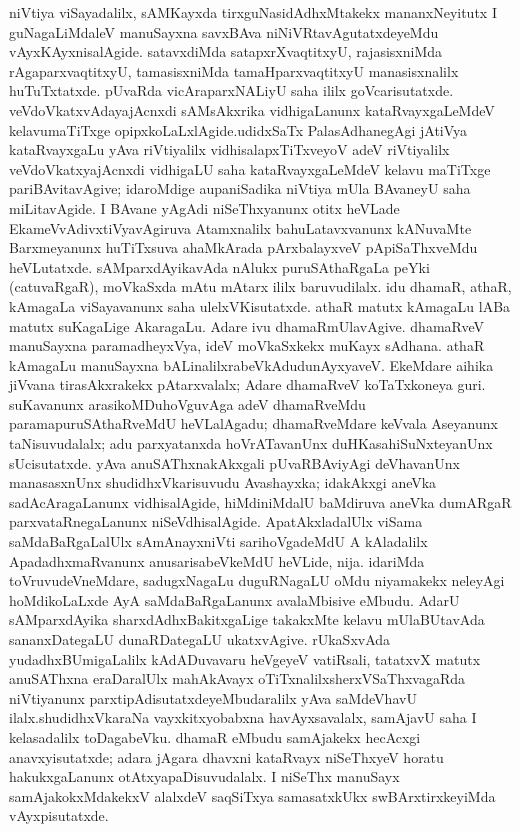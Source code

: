 niVtiya viSayadalilx, sAMKayxda tirxguNasidAdhxMtakekx mananxNeyitutx I guNa\-gaLiMdaleV manuSayxna savxBAva niNiVRtavAgutatxdeyeMdu vAyxKAyxnisalAgide. satavxdiMda satapxrXvaq\break\-titxyU, rajasisxniMda rAgaparxvaqtitxyU, tamasisxniMda tamaHparxvaqtitxyU manasisxnalilx huTuTx\-tatxde. pUvaRda vicAraparxNALiyU saha ililx goVcarisutatxde. veVdoVkatxvAda\break yajAcnxdi sAMsAkxrika vidhigaLanunx kataRvayxgaLeMdeV kelavumaTiTxge opipxkoLaLxlAgide.\break udidxSaTx PalasAdhanegAgi jAtiVya kataRvayxgaLu yAva riVtiyalilx vidhisalapxTiTxveyoV adeV riVtiyalilx veVdoVkatxyajAcnxdi vidhigaLU saha kataRvayxgaLeMdeV kelavu maTiTxge pari\-BAvitavAgive; idaroMdige aupaniSadika niVtiya mUla BAvaneyU saha miLita\-vAgide. I BAvane yAgAdi niSeThxyanunx otitx heVLade EkameVvAdivxtiVyavAgiruva Atamxnalilx bahuLatavxvanunx kANuvaMte Barxmeyanunx huTiTxsuva ahaMkArada pArxbalayxveV pApiSaThxveMdu heVLutatxde. sAMparxdAyikavAda nAlukx puruSAthaRgaLa peYki (catu\break\-vaRgaR), moVkaSxda mAtu mAtarx ililx baruvudilalx. idu dhamaR, athaR, kAmagaLa viSayavanunx saha ulelxVKisutatxde. athaR matutx kAmagaLu lABa matutx suKagaLige AkaragaLu. Adare ivu dhamaRmUlavAgive. dhamaRveV manuSayxna paramadheyxVya, ideV moVkaSxkekx muKayx sAdhana. athaR kAmagaLu manuSayxna bALinalilxrabeVkAdudu\break nAyxyaveV. EkeMdare aihika jiVvana tirasAkxrakekx pAtarxvalalx; Adare dhamaRveV koTaTx\break koneya guri. suKavanunx arasikoMDuhoVguvAga adeV dhamaRveMdu parama\-puruSAthaRveMdU heVLalAgadu; dhamaRveMdare keVvala Aseyanunx taNisuvudalalx; adu parxyatanxda hoVrATavanUnx duHKasahiSuNxteyanUnx sUcisutatxde. yAva anu\-SAThxnakAkxgali pUvaRBAviyAgi deVhavanUnx manasasxnUnx shudidhxVkarisuvudu Avashayxka; idakAkxgi aneVka sadAcAragaLanunx vidhisalAgide, hiMdiniMdalU baMdiruva aneVka dumARgaR parxvataRnegaLanunx niSeVdhisalAgide. ApatAkxladalUlx viSama saMdaBaR\break\-gaLalUlx sAmAnayxniVti sarihoVgadeMdU A kAladalilx ApadadhxmaRvanunx anusarisa\break\-beVkeMdU heVLide, nija. idariMda toVruvudeVneMdare, sadugxNagaLu duguRNa\-gaLU oMdu niyamakekx neleyAgi hoMdikoLaLxde AyA saMdaBaRgaLanunx avalaMbi\-sive eMbudu. AdarU sAMparxdAyika sharxdAdhxBakitxgaLige takakxMte kelavu mUla\-BUta\-vAda sananxDategaLU dunaRDategaLU ukatxvAgive. rUkaSxvAda yudadhxBUmigaLalilx kAdADu\-vavaru heVgeyeV vatiRsali, tatatxvX matutx anuSAThxna eraDaralUlx mahAkAvayx oTiTx\-nalilx\break sherxVSaThxvagaRda niVtiyanunx parxtipAdisutatxdeyeMbudaralilx yAva saMdeVhavU ilalx.\break shudidhxV\-karaNa vayxkitxyobabxna havAyxsavalalx, samAjavU saha I kelasadalilx toDagabeVku. dhamaR eMbudu samAjakekx hecAcxgi anavxyisutatxde; adara jAgara dhavxni kataRvayx niSeThxyeV horatu hakukxgaLanunx otAtxyapaDisuvudalalx. I niSeThx manuSayx samAjakokxMdakekxV alalxdeV saqSiTxya samasatxkUkx swBArxtirxkeyiMda vAyxpisutatxde.

